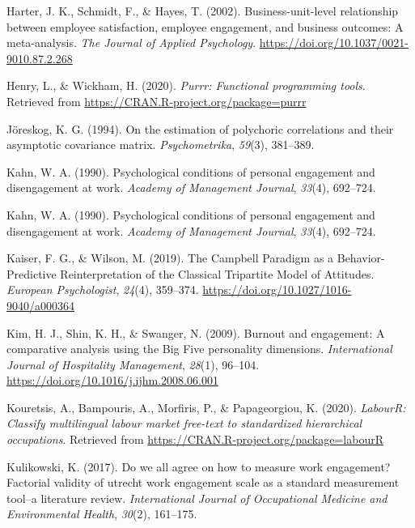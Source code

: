 \documentclass[
  english,
  man]{apa6}
\begin{document}
\leavevmode\hypertarget{ref-harter_business-unit-level_2002}{}%
Harter, J. K., Schmidt, F., \& Hayes, T. (2002). Business-unit-level relationship between employee satisfaction, employee engagement, and business outcomes: A meta-analysis. \emph{The Journal of Applied Psychology}. \url{https://doi.org/10.1037/0021-9010.87.2.268}

\leavevmode\hypertarget{ref-R-purrr}{}%
Henry, L., \& Wickham, H. (2020). \emph{Purrr: Functional programming tools}. Retrieved from \url{https://CRAN.R-project.org/package=purrr}

\leavevmode\hypertarget{ref-joreskog1994estimation}{}%
Jöreskog, K. G. (1994). On the estimation of polychoric correlations and their asymptotic covariance matrix. \emph{Psychometrika}, \emph{59}(3), 381--389.

\leavevmode\hypertarget{ref-kahn_psychological_1990}{}%
Kahn, W. A. (1990). Psychological conditions of personal engagement and disengagement at work. \emph{Academy of Management Journal}, \emph{33}(4), 692--724.

\leavevmode\hypertarget{ref-kahn1990psychological}{}%
Kahn, W. A. (1990). Psychological conditions of personal engagement and disengagement at work. \emph{Academy of Management Journal}, \emph{33}(4), 692--724.

\leavevmode\hypertarget{ref-kaiser_campbell_2019}{}%
Kaiser, F. G., \& Wilson, M. (2019). The Campbell Paradigm as a Behavior-Predictive Reinterpretation of the Classical Tripartite Model of Attitudes. \emph{European Psychologist}, \emph{24}(4), 359--374. \url{https://doi.org/10.1027/1016-9040/a000364}

\leavevmode\hypertarget{ref-kim_burnout_2009}{}%
Kim, H. J., Shin, K. H., \& Swanger, N. (2009). Burnout and engagement: A comparative analysis using the Big Five personality dimensions. \emph{International Journal of Hospitality Management}, \emph{28}(1), 96--104. \url{https://doi.org/10.1016/j.ijhm.2008.06.001}

\leavevmode\hypertarget{ref-R-labourR}{}%
Kouretsis, A., Bampouris, A., Morfiris, P., \& Papageorgiou, K. (2020). \emph{LabourR: Classify multilingual labour market free-text to standardized hierarchical occupations}. Retrieved from \url{https://CRAN.R-project.org/package=labourR}

\leavevmode\hypertarget{ref-kulikowski2017we}{}%
Kulikowski, K. (2017). Do we all agree on how to measure work engagement? Factorial validity of utrecht work engagement scale as a standard measurement tool--a literature review. \emph{International Journal of Occupational Medicine and Environmental Health}, \emph{30}(2), 161--175.
\end{document}
